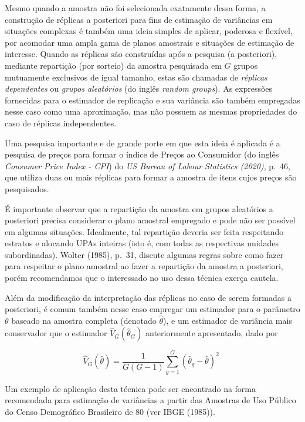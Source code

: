 \documentclass[
  12pt,
  brazilian,
]{book}
\theoremstyle{definition}
\theoremstyle{definition}
\theoremstyle{definition}
\theoremstyle{definition}
\theoremstyle{remark}
\begin{document}
Mesmo quando a amostra não foi selecionada exatamente dessa forma, a construção de réplicas a posteriori para fins de estimação de variâncias em situações complexas é também uma ideia simples de aplicar, poderosa e flexível, por acomodar uma ampla gama de planos amostrais e situações de estimação de interesse. Quando as réplicas são construídas após a pesquisa (a posteriori), mediante repartição (por sorteio) da amostra pesquisada em \(G\) grupos mutuamente exclusivos de igual tamanho, estas são chamadas de \emph{réplicas dependentes} ou \emph{grupos aleatórios} (do inglês \emph{random groups}). As expressões fornecidas para o estimador de replicação e sua
variância são também empregadas nesse caso como uma aproximação, mas não possuem as mesmas propriedades do caso de réplicas independentes.

Uma pesquisa importante e de grande porte em que esta ideia é aplicada é a pesquisa de preços para formar o índice de Preços ao Consumidor (do inglês \emph{Consumer Price Index - CPI}) do \emph{US Bureau of Labour Statistics (2020)}, p.~46, que utiliza duas ou mais réplicas para formar a amostra de itens cujos preços são pesquisados.

É importante observar que a repartição da amostra em grupos aleatórios a posteriori precisa considerar o plano amostral empregado e pode não ser possível em algumas situações. Idealmente, tal repartição deveria ser feita respeitando estratos e alocando UPAs inteiras (isto é, com todas as respectivas unidades subordinadas). Wolter (1985), p.~31, discute algumas regras sobre como fazer para respeitar o plano amostral ao fazer a repartição da amostra a posteriori, porém recomendamos que o interessado no uso dessa técnica exerça cautela.

Além da modificação da interpretação das réplicas no caso de serem formadas a posteriori, é comum também nesse caso empregar um estimador para o parâmetro \(\theta\) baseado na amostra completa (denotado \(\widehat{\theta}\)), e um estimador de variância mais conservador que o estimador \(\widehat{V}_{G}\left( \widehat{\theta }_{G}\right)\) anteriormente apresentado, dado por

\begin{equation}
\widehat{V}_{G}\left( \widehat{\theta }\right) =\frac{1}{G\left( G-1\right) 
}\sum_{g=1}^{G}\left( \widehat{\theta }_{g}-\widehat{\theta }\right) ^{2} \,\,
\label{eq:estpa26}
\end{equation}

Um exemplo de aplicação desta técnica pode ser encontrado na forma recomendada para estimação de variâncias a partir das Amostras de Uso Público do Censo Demográfico Brasileiro de 80 (ver IBGE (1985)).
\end{document}
